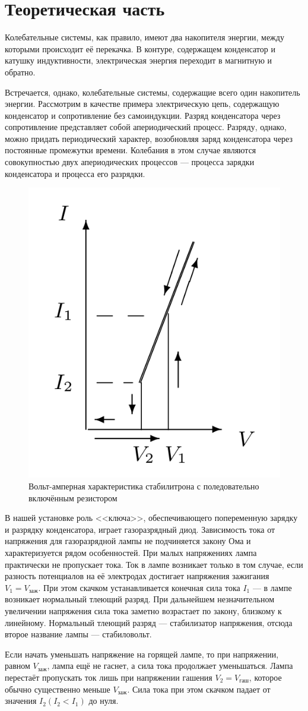 \documentclass[a4paper, fontsize=14pt]{article}
\begin{document}
\section*{Теоретическая часть}
Колебательные системы, как правило, имеют два накопителя энергии, между которыми происходит её перекачка. В контуре, содержащем конденсатор и катушку индуктивности, электрическая энергия переходит в магнитную и обратно.

Встречается, однако, колебательные системы, содержащие всего один накопитель энергии. Рассмотрим в качестве примера электрическую цепь, содержащую конденсатор и сопротивление без самоиндукции. Разряд конденсатора через сопротивление представляет собой апериодический процесс. Разряду, однако, можно придать периодический характер, возобновляя заряд конденсатора через постоянные промежутки времени. Колебания в этом случае являются совокупностью двух апериодических процессов --- процесса зарядки конденсатора и процесса его разрядки.

\begin{figure}[H]
		\includegraphics[width = 0.3\linewidth]{va.png}
		\caption{Вольт-амперная характеристика стабилитрона с поледовательно включённым резистором}
	\end{figure}
В нашей установке роль <<ключа>>, обеспечивающего попеременную зарядку и разрядку конденсатора, играет газоразрядный диод. Зависимость тока от напряжения для газоразрядной лампы не подчиняется закону Ома и характеризуется рядом особенностей. При малых напряжениях лампа практически не пропускает тока. Ток в лампе возникает только в том случае, если разность потенциалов на её электродах достигает напряжения зажигания $V_1 = V_\text{заж}$. При этом скачком устанавливается конечная сила тока $I_1$ --- в лампе возникает нормальный тлеющий разряд. При дальнейшем незначительном увеличении напряжения сила тока заметно возрастает по закону, близкому к линейному. Нормальный тлеющий разряд --- стабилизатор напряжения, отсюда второе название лампы --- стабиловольт.

Если начать уменьшать напряжение на горящей лампе, то при напряжении, равном $V_\text{заж}$, лампа ещё не гаснет, а сила тока продолжает уменьшаться. Лампа перестаёт пропускать ток лишь при напряжении гашения $V_2 = V_\text{гаш}$, которое обычно существенно меньше $V_\text{заж}$. Сила тока при этом скачком падает от значения $I_2 (I_2 < I_1)$ до нуля.
\end{document}
